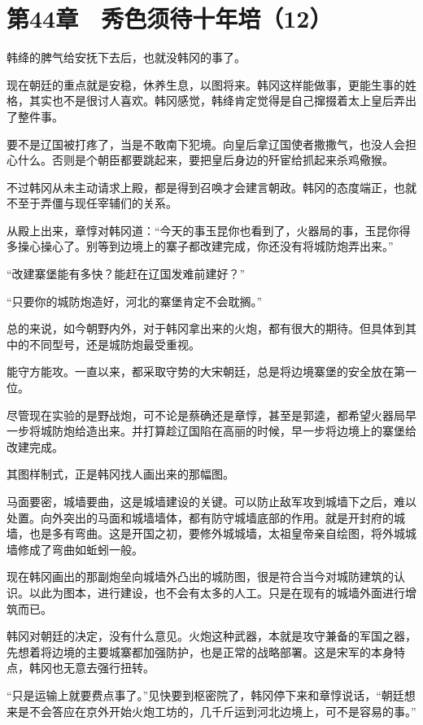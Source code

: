 \section{第44章　秀色须待十年培（12）}

韩绛的脾气给安抚下去后，也就没韩冈的事了。

现在朝廷的重点就是安稳，休养生息，以图将来。韩冈这样能做事，更能生事的姓格，其实也不是很讨人喜欢。韩冈感觉，韩绛肯定觉得是自己撺掇着太上皇后弄出了整件事。

要不是辽国被打疼了，当是不敢南下犯境。向皇后拿辽国使者撒撒气，也没人会担心什么。否则是个朝臣都要跳起来，要把皇后身边的歼宦给抓起来杀鸡儆猴。

不过韩冈从未主动请求上殿，都是得到召唤才会建言朝政。韩冈的态度端正，也就不至于弄僵与现任宰辅们的关系。

从殿上出来，章惇对韩冈道：“今天的事玉昆你也看到了，火器局的事，玉昆你得多操心操心了。别等到边境上的寨子都改建完成，你还没有将城防炮弄出来。”

“改建寨堡能有多快？能赶在辽国发难前建好？”

“只要你的城防炮造好，河北的寨堡肯定不会耽搁。”

总的来说，如今朝野内外，对于韩冈拿出来的火炮，都有很大的期待。但具体到其中的不同型号，还是城防炮最受重视。

能守方能攻。一直以来，都采取守势的大宋朝廷，总是将边境寨堡的安全放在第一位。

尽管现在实验的是野战炮，可不论是蔡确还是章惇，甚至是郭逵，都希望火器局早一步将城防炮给造出来。并打算趁辽国陷在高丽的时候，早一步将边境上的寨堡给改建完成。

其图样制式，正是韩冈找人画出来的那幅图。

马面要密，城墙要曲，这是城墙建设的关键。可以防止敌军攻到城墙下之后，难以处置。向外突出的马面和城墙墙体，都有防守城墙底部的作用。就是开封府的城墙，也是多有弯曲。这是开国之初，要修外城城墙，太祖皇帝亲自绘图，将外城城墙修成了弯曲如蚯蚓一般。

现在韩冈画出的那副炮垒向城墙外凸出的城防图，很是符合当今对城防建筑的认识。以此为图本，进行建设，也不会有太多的人工。只是在现有的城墙外面进行增筑而已。

韩冈对朝廷的决定，没有什么意见。火炮这种武器，本就是攻守兼备的军国之器，先想着将边境的主要城寨都加强防护，也是正常的战略部署。这是宋军的本身特点，韩冈也无意去强行扭转。

“只是运输上就要费点事了。”见快要到枢密院了，韩冈停下来和章惇说话，“朝廷想来是不会答应在京外开始火炮工坊的，几千斤运到河北边境上，可不是容易的事。”

